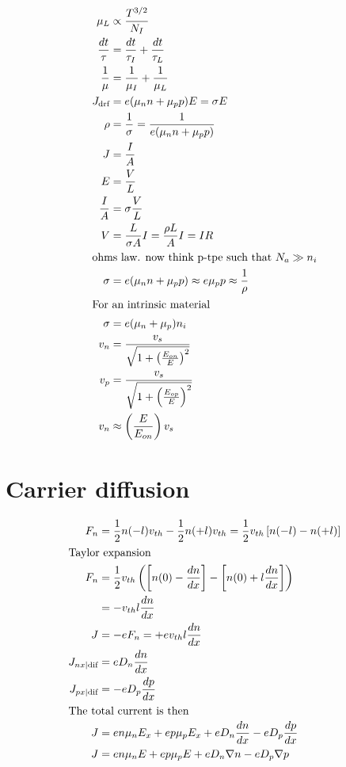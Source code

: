 \documentclass[article,oneside]{memoir}
\begin{document}
\begin{align*}
        \mu_L &\propto \frac{T^{3/2}}{N_I}\\
        \frac{dt}{\tau}&= \frac{dt}{\tau_I}+\frac{dt}{\tau_L}\\
        \frac{1}{\mu}&=\frac{1}{\mu_I}+\frac{1}{\mu_L}\\
        J_{\textup{drf}}&=e(\mu_nn+\mu_pp)E=\sigma E\\
        \rho &= \frac{1}{\sigma}=\frac{1}{e(\mu_nn+\mu_pp)}\\ 
        J&= \frac{I}{A}\\
        E&=\frac{V}{L}\\
        \frac{I}{A}&=\sigma \frac{V}{L}\\
        V&=\frac{L}{\sigma A}I=\frac{\rho L}{A}I=IR\\
        \intertext{ohms law. now think p-tpe such that $N_{a}\gg n_i$}
        \sigma&=e(\mu_nn+\mu_pp)\approx e\mu_{p}p\approx \frac{1}{\rho}\\
        \intertext{For an intrinsic material}
        \sigma&=e(\mu_n+\mu_p)n_i\\
        v_n&=\frac{v_s}{\sqrt{1+\left( \frac{E_{on}}{E} \right)^2}}\\
        v_p&=\frac{v_s}{\sqrt{1+\left( \frac{E_{op}}{E} \right)^2}}\\
        v_n&\approx\left( \frac{E}{E_{on}} \right)v_s\\
\end{align*}
\chapter{Carrier diffusion}

\begin{align*}
        F_n&= \frac{1}{2} n(-l) v_{th} - \frac{1}{2} n(+l) v_{th} = \frac{1}{2} v_{th} \left[ n(-l) - n(+l) \right]\\
        \intertext{Taylor expansion}
        F_n&= \frac{1}{2} v_{th} \left( \left[ n(0)-\frac{dn}{dx} \right]-\left[ n(0)+l \frac{dn}{dx} \right] \right)\\
        &=-v_{th}l \frac{dn}{dx}\\
        J&=-eF_n=+ev_{th}l \frac{dn}{dx}\\
        J_{nx\vert \textup{dif}}&=eD_n \frac{dn}{dx}\\
        J_{px\vert \textup{dif}}&=-eD_p \frac{dp}{dx}\\
        \intertext{The total current is then}
        J&=en\mu_nE_x+ep\mu_pE_x+eD_n \frac{dn}{dx} - eD_p \frac{dp}{dx}\\
        J&= en\mu_nE+ep\mu_pE+eD_n\nabla n -eD_p\nabla p\\
\end{align*}
\end{document}
